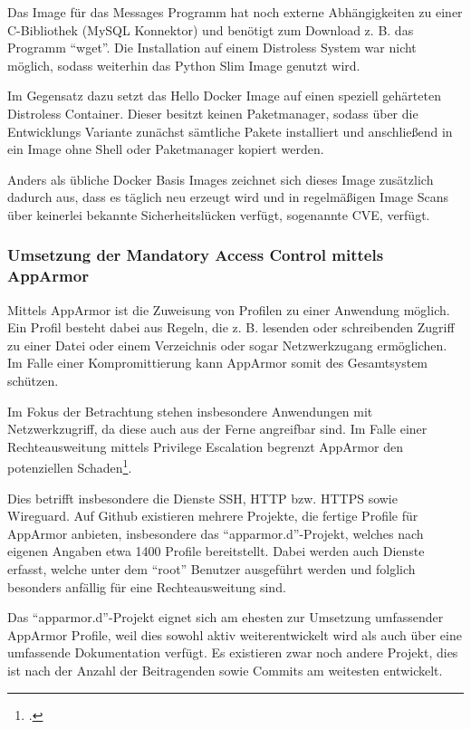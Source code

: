 Das Image für das Messages Programm hat noch externe Abhängigkeiten zu einer C-Bibliothek (MySQL Konnektor) und benötigt zum Download z. B. das Programm \enquote{wget}. Die Installation auf einem Distroless System war nicht möglich, sodass weiterhin das Python Slim Image genutzt wird.

Im Gegensatz dazu setzt das Hello Docker Image auf einen speziell gehärteten Distroless Container. Dieser besitzt keinen Paketmanager, sodass über die Entwicklungs Variante zunächst sämtliche Pakete installiert und anschließend in ein Image ohne Shell oder Paketmanager kopiert werden.

Anders als übliche Docker Basis Images zeichnet sich dieses Image zusätzlich dadurch aus, dass es täglich neu erzeugt wird und in regelmäßigen Image Scans über keinerlei bekannte Sicherheitslücken verfügt, sogenannte \ac{CVE}, verfügt.

\subsubsection{Umsetzung der Mandatory Access Control mittels AppArmor}\label{kap:installation_apparmor}

Mittels AppArmor ist die Zuweisung von Profilen zu einer Anwendung möglich. Ein Profil besteht dabei aus Regeln, die z. B. lesenden oder schreibenden Zugriff zu einer Datei oder einem Verzeichnis oder sogar Netzwerkzugang ermöglichen. Im Falle einer Kompromittierung kann AppArmor somit des Gesamtsystem schützen.

Im Fokus der Betrachtung stehen insbesondere Anwendungen mit Netzwerkzugriff, da diese auch aus der Ferne angreifbar sind. Im Falle einer Rechteausweitung mittels Privilege Escalation begrenzt AppArmor den potenziellen Schaden\footcite[Vgl.][]{hutchinsIntelligenceDrivenComputerNetwork}.

Dies betrifft insbesondere die Dienste \ac{SSH}, \ac{HTTP} bzw. \ac{HTTPS} sowie Wireguard. Auf Github existieren mehrere Projekte, die fertige Profile für AppArmor anbieten, insbesondere das \enquote{apparmor.d}-Projekt, welches nach eigenen Angaben etwa 1400 Profile bereitstellt. Dabei werden auch Dienste erfasst, welche unter dem \enquote{root} Benutzer ausgeführt werden und folglich besonders anfällig für eine Rechteausweitung sind.

Das \enquote{apparmor.d}-Projekt eignet sich am ehesten zur Umsetzung umfassender AppArmor Profile, weil dies sowohl aktiv weiterentwickelt wird als auch über eine umfassende Dokumentation verfügt. Es existieren zwar noch andere Projekt, dies ist nach der Anzahl der Beitragenden sowie Commits am weitesten entwickelt.

